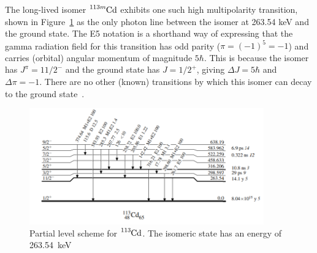 \documentclass[12pt,a4paper]{article}
\begin{document}
\medskip
The long-lived isomer $\ce{^{113m}Cd}$ exhibits one such high multipolarity transition, shown in Figure~\ref{fig:cd113} as the only photon line between the isomer at 263.54 keV and the ground state.
The E5 notation is a shorthand way of expressing that the gamma radiation field for this transition has odd parity ($\pi = (-1)^5  = -1$) and carries (orbital) angular momentum of magnitude $5\hbar$. This is because the isomer has $J^\pi = 11/2^-$ and the ground state has $J = 1/2^+$, giving $\Delta J = 5\hbar$ and $\Delta \pi = -1$.
There are no other (known) transitions by which this isomer can decay to the ground state~\cite{j._blachot_nucl._data_sheets_111_1471_2010_data_extracted_from_the_ensdf_database_revision_of_june_2010._notitle_nodate}.

\begin{figure}
	\centering
	\includegraphics[width=0.9\textwidth]{113cd_partial_level_scheme_ENSDF.png}
	\caption{Partial level scheme for $\ce{^{113}Cd}$. The isomeric state has an energy of 263.54~keV~\cite{j._blachot_nucl._data_sheets_111_1471_2010_data_extracted_from_the_ensdf_database_revision_of_june_2010._notitle_nodate}}\label{fig:cd113}
\end{figure}

\end{document}
